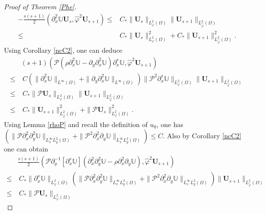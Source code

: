 \documentclass{amsart}
\numberwithin{equation}{section}
\begin{document}
\begin{proof}[Proof of Theorem \ref{Phe}]
\begin{align}\label{J61}
-\frac{s(s+1)}{2}\left(\partial_{x}^{2}\mathbb{U}\mathbf{U}_{s},\hat{\varphi}^{2}\mathbf{U}_{s+1}\right)
\leq& C_{*}\|\mathbf{U}_{s}\|_{L_{\varphi}^{2}(\Omega)}\|\mathbf{U}_{s+1}\|_{L_{\hat{\varphi}}^{2}(\Omega)}\\
\leq& C_{*}\|\mathbf{U}_{s}\|_{L_{\varphi}^{2}(\Omega)}^{2}
     +C_{*}\|\mathbf{U}_{s+1}\|_{L_{\hat{\varphi}}^{2}(\Omega)}^{2}.\nonumber
\end{align}
Using Corollary \ref{ncC2}, one can deduce
\begin{align}\label{J62}
&(s+1)\left(\mathcal{P}\left(\rho\partial_{x}^{2}\mathbb{U}-\partial_{y}\partial_{x}^{2}\mathbb{U}\right)\partial_{x}^{s}\mathbb{U},\hat{\varphi}^{2}\mathbf{U}_{s+1}\right)\\
\leq&~C(\|\partial_{x}^{2}\mathbb{U}\|_{L^{\infty}(\Omega)}+\|\partial_{y}\partial_{x}^{2}\mathbb{U}\|_{L^{\infty}(\Omega)})
      \|\mathcal{P}^{2}\partial_{x}^{s}\mathbb{U}\|_{L_{\varphi}^{2}(\Omega)}
      \|\mathbf{U}_{s+1}\|_{L_{\hat{\varphi}}^{2}(\Omega)}\nonumber\\
\leq&~C_{*}\|\mathcal{P}\mathbf{U}_{s}\|_{L_{\varphi}^{2}(\Omega)}
      \|\mathbf{U}_{s+1}\|_{L_{\hat{\varphi}}^{2}(\Omega)}\nonumber\\
\leq&~C_{*}\|\mathbf{U}_{s+1}\|_{L_{\hat{\varphi}}^{2}(\Omega)}^{2}
     +\|\mathcal{P}\mathbf{U}_{s}\|_{L_{\varphi}^{2}(\Omega)}^{2}.\nonumber
\end{align}
Using Lemma \ref{rhoP} and recall the definition of $u_{0}$, one has
$\left(\|\mathcal{P}\partial_{x}^{2}\partial_{y}^{2}\mathbb{U}\|_{L_{x}^{\infty}L_{y}^{2}(\Omega)}
 +\|\mathcal{P}^{2}\partial_{x}^{2}\partial_{y}\mathbb{U}\|_{L_{x}^{\infty}L_{y}^{2}(\Omega)}\right)\leq C$.
Also by Corollary \ref{ncC2} one can obtain
\begin{align}\label{J63}
&\frac{s(s+1)}{2}\left(\mathcal{P}\partial_{y}^{-1}[\partial_{x}^{s}\mathbb{U}](\partial_{x}^{2}\partial_{y}^{2}\mathbb{U}-\rho\partial_{x}^{2}\partial_{y}\mathbb{U}),\hat{\varphi}^{2}\mathbf{U}_{s+1}\right)\\
\leq&~C_{*}\|\partial_{x}^{s}\mathbb{U}\|_{L_{\varphi}^{2}(\Omega)}
       \left(\|\mathcal{P}\partial_{x}^{2}\partial_{y}^{2}\mathbb{U}\|_{L_{x}^{\infty}L_{y}^{2}(\Omega)}+\|\mathcal{P}^{2}\partial_{x}^{2}\partial_{y}\mathbb{U}\|_{L_{x}^{\infty}L_{y}^{2}(\Omega)}\right)
       \|\mathbf{U}_{s+1}\|_{L_{\hat{\varphi}}^{2}(\Omega)}\nonumber\\
\leq&~C_{*}\|\mathcal{P}\mathbf{U}_{s}\|_{L_{\varphi}^{2}(\Omega)}

\end{align}
\end{proof}
\end{document}
